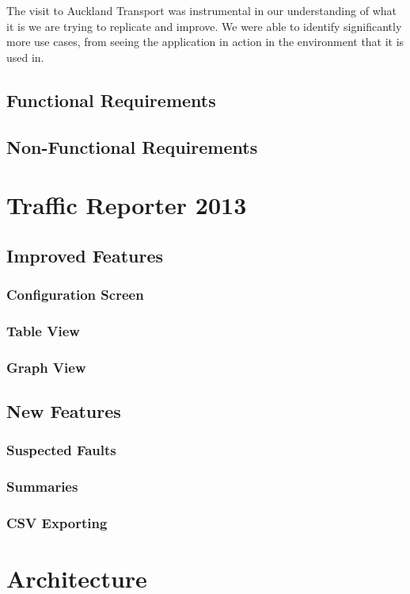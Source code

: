 \documentclass{article}
\begin{document}
The visit to Auckland Transport was instrumental in our
understanding of what it is we are trying to replicate and
improve. We were able to identify significantly more use
cases, from seeing the application in action in the environment
that it is used in.

\subsection{Functional Requirements}
\subsection{Non-Functional Requirements}

\section{Traffic Reporter 2013}
\subsection{Improved Features}
\subsubsection{Configuration Screen}
\subsubsection{Table View}
\subsubsection{Graph View}
\subsection{New Features}
\subsubsection{Suspected Faults}
\subsubsection{Summaries}
\subsubsection{CSV Exporting}

\section{Architecture}
\end{document}
